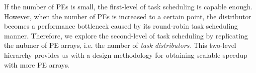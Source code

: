 If the number of PEs is small, the first-level of task scheduling is capable enough. 
However, when the number of PEs is increased to a certain point, 
the distributor becomes a performance bottleneck caused by its round-robin task scheduling manner.
Therefore, we explore the second-level of task scheduling by replicating the nubmer of PE arrays, i.e. the number of \textit{task distributors}. 
This two-level hierarchy provides us with a design methodology for obtaining scalable speedup with more PE arrays.






